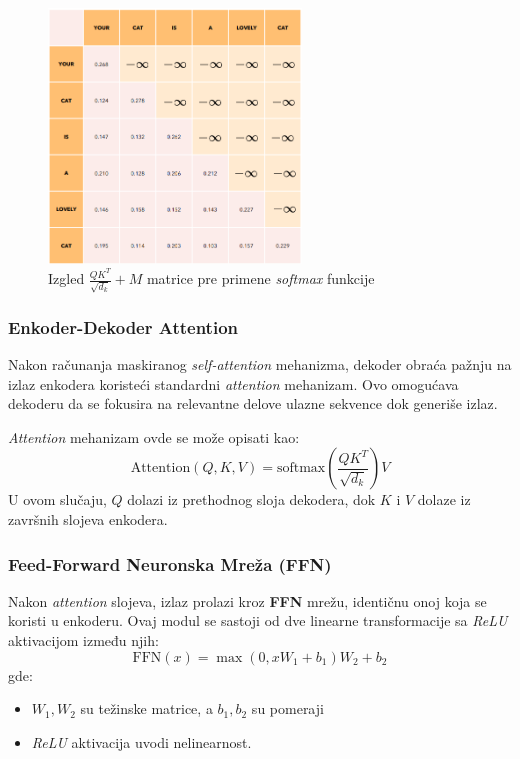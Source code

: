\documentclass[12pt]{article}
\begin{document}
   \begin{figure}[h!]
      \centering
      \includegraphics[width=0.6\textwidth]{masked_attention.png}
      \caption{Izgled $\frac{QK^T}{\sqrt{d_k}} + M$ matrice pre primene \textit{softmax} funkcije}
      \label{fig:masked_attention}
   \end{figure}

   \subsubsection*{Enkoder-Dekoder Attention}

   Nakon računanja maskiranog \textit{self-attention} mehanizma, dekoder obraća pažnju na 
   izlaz enkodera koristeći standardni \textit{attention} mehanizam. Ovo omogućava dekoderu da 
   se fokusira na relevantne delove ulazne sekvence dok generiše izlaz.

   \textit{Attention} mehanizam ovde se može opisati kao:
   \[
   \text{Attention}(Q, K, V) = \text{softmax}\left(\frac{QK^T}{\sqrt{d_k}}\right)V
   \]
   U ovom slučaju, \( Q \) dolazi iz prethodnog sloja dekodera, dok \( K \) i \( V \) 
   dolaze iz završnih slojeva enkodera.

   \subsubsection*{Feed-Forward Neuronska Mreža (FFN)}
   Nakon \textit{attention} slojeva, izlaz prolazi kroz \textbf{FFN} mrežu, 
   identičnu onoj koja se koristi u enkoderu. Ovaj modul se sastoji od dve 
   linearne transformacije sa \textit{ReLU} aktivacijom između njih:
   \[
   \text{FFN}(x) = \max(0, xW_1 + b_1)W_2 + b_2
   \]
   gde:
   \begin{itemize}
      \item \( W_1, W_2 \) su težinske matrice, a \( b_1, b_2 \) su pomeraji
      \item \textit{ReLU} aktivacija uvodi nelinearnost.
   \end{itemize}
\end{document}
